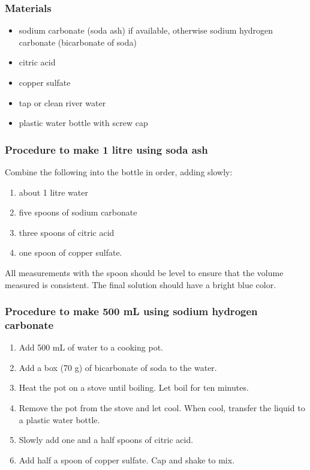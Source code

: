 \subsubsection{Materials}
\begin{itemize}
\item{sodium carbonate (soda ash) if available, otherwise sodium hydrogen carbonate (bicarbonate of soda)}
\item{citric acid}
\item{copper sulfate}
\item{tap or clean river water}
\item{plastic water bottle with screw cap}
\end{itemize}

\subsubsection{Procedure to make 1 litre using soda ash}
Combine the following into the bottle in order, adding slowly:
\begin{enumerate}
\item{about 1 litre water}
\item{five spoons of sodium carbonate}
\item{three spoons of citric acid}
\item{one spoon of copper sulfate.}
\end{enumerate}

All measurements with the spoon should be level to ensure that the volume measured is consistent. The final solution should have a bright blue color.

\subsubsection{Procedure to make 500 mL using sodium hydrogen carbonate}
\begin{enumerate}
\item{Add 500 mL of water to a cooking pot.}
\item{Add a box (70 g) of bicarbonate of soda to the water.}
\item{Heat the pot on a stove until boiling. Let boil for ten minutes.}
\item{Remove the pot from the stove and let cool. When cool, transfer the liquid to a plastic water bottle.}
\item{Slowly add one and a half spoons of citric acid.}
\item{Add half a spoon of copper sulfate. Cap and shake to mix.}
\end{enumerate}

